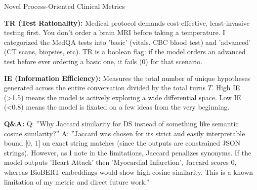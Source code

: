 \begin{frame}{Novel Process-Oriented Clinical Metrics}
{\textbf{TR (Test Rationality):} Medical protocol demands cost-effective, least-invasive testing first. You don't order a brain MRI before taking a temperature. I categorized the MedQA tests into 'basic' (vitals, CBC blood test) and 'advanced' (CT scans, biopsies, etc). TR is a boolean flag: if the model orders an advanced test before ever ordering a basic one, it fails (0) for that scenario.

\textbf{IE (Information Efficiency):} Measures the total number of unique hypotheses generated across the entire conversation divided by the total turns $T$. High IE (>1.5) means the model is actively exploring a wide differential space. Low IE (<0.8) means the model is fixated on a few ideas from the very beginning.

\textbf{Q\&A:}
Q: ''Why Jaccard similarity for DS instead of something like semantic cosine similarity?''
A: ''Jaccard was chosen for its strict and easily interpretable bound [0, 1] on exact string matches (since the outputs are constrained JSON strings). However, as I note in the limitations, Jaccard penalizes synonyms. If the model outputs 'Heart Attack' then 'Myocardial Infarction', Jaccard scores 0, whereas BioBERT embeddings would show high cosine similarity. This is a known limitation of my metric and direct future work.''
}
\end{frame}

